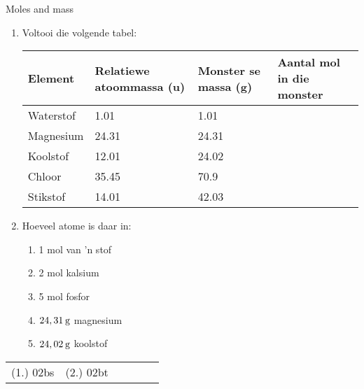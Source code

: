             \begin{exercises}{Moles and mass }
            \nopagebreak
      \label{m38717*id276067}\begin{enumerate}[noitemsep, label=\textbf{\arabic*}. ] 
\item Voltooi die volgende tabel:
          \begin{table}[H]
        \begin{center}
      \label{m38717*id276082}
    \noindent
      \begin{tabular}{|l|l|l|l|}\hline
\textbf{Element} & \textbf{Relatiewe atoommassa (u)} & \textbf{Monster se massa (g)} & \textbf{Aantal mol in die monster} \\ \hline
        Waterstof & 1.01 & 1.01 & \\ \hline
        Magnesium & 24.31 & 24.31 & \\ \hline
        Koolstof & 12.01 & 24.02 & \\ \hline
        Chloor & 35.45 & 70.9 & \\ \hline
        Stikstof & 14.01 & 42.03 & \\ \hline
    \end{tabular}
      \end{center}
\end{table}
    \par
          \label{m38717*uid3}\item 
Hoeveel atome is daar in:
\label{m38717*id276311}\begin{enumerate}[noitemsep, label=\textbf{\alph*}. ] 
            \label{m38717*uid4}\item 1 mol van 'n stof
\label{m38717*uid5}\item 2 mol kalsium
\label{m38717*uid6}\item 5 mol fosfor
\label{m38717*uid7}\item $24,31\phantom{\rule{2pt}{0ex}}\text{g}$ magnesium
\label{m38717*uid8}\item $24,02\phantom{\rule{2pt}{0ex}}\text{g}$ koolstof
\end{enumerate}
                \end{enumerate}
    \label{m38717*cid3}
\practiceinfo
 \par \begin{tabular}[h]{cccccc}
 (1.) 02bs  &  (2.) 02bt  & \end{tabular}
\end{exercises}
